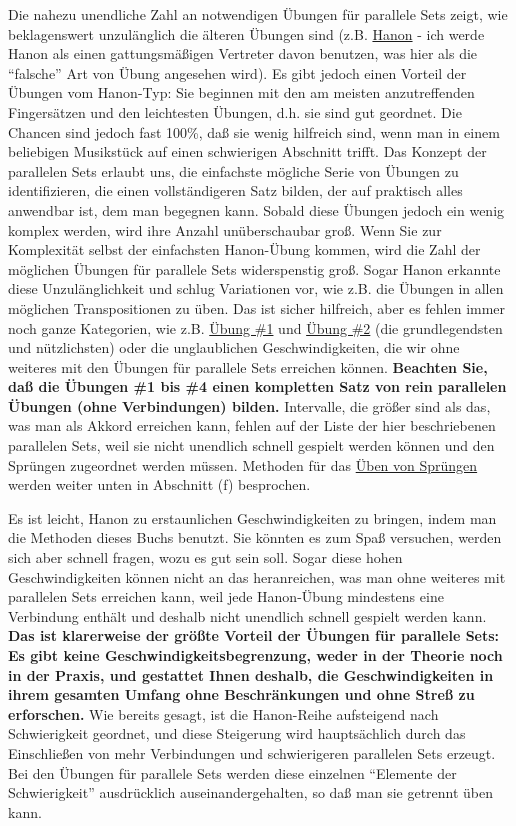 Die nahezu unendliche Zahl an notwendigen Übungen für parallele Sets zeigt, wie beklagenswert unzulänglich die älteren Übungen sind (z.B. \hyperlink{c1iii7h}{Hanon} - ich werde Hanon als einen gattungsmäßigen Vertreter davon benutzen, was hier als die \enquote{falsche} Art von Übung angesehen wird).
Es gibt jedoch einen Vorteil der Übungen vom Hanon-Typ: Sie beginnen mit den am meisten anzutreffenden Fingersätzen und den leichtesten Übungen, d.h. sie sind gut geordnet.
Die Chancen sind jedoch fast 100\%, daß sie wenig hilfreich sind, wenn man in einem beliebigen Musikstück auf einen schwierigen Abschnitt trifft.
Das Konzept der parallelen Sets erlaubt uns, die einfachste mögliche Serie von Übungen zu identifizieren, die einen vollständigeren Satz bilden, der auf praktisch alles anwendbar ist, dem man begegnen kann.
Sobald diese Übungen jedoch ein wenig komplex werden, wird ihre Anzahl unüberschaubar groß.
Wenn Sie zur Komplexität selbst der einfachsten Hanon-Übung kommen, wird die Zahl der möglichen Übungen für parallele Sets widerspenstig groß.
Sogar Hanon erkannte diese Unzulänglichkeit und schlug Variationen vor, wie z.B. die Übungen in allen möglichen Transpositionen zu üben.
Das ist sicher hilfreich, aber es fehlen immer noch ganze Kategorien, wie z.B. \hyperlink{c1iii7b1}{Übung \#1} und \hyperlink{c1iii7b2}{Übung \#2} (die grundlegendsten und nützlichsten) oder die unglaublichen Geschwindigkeiten, die wir ohne weiteres mit den Übungen für parallele Sets erreichen können.
\textbf{Beachten Sie, daß die Übungen \#1 bis \#4 einen kompletten Satz von rein parallelen Übungen (ohne Verbindungen) bilden.}
Intervalle, die größer sind als das, was man als Akkord erreichen kann, fehlen auf der Liste der hier beschriebenen parallelen Sets, weil sie nicht unendlich schnell gespielt werden können und den Sprüngen zugeordnet werden müssen.
Methoden für das \hyperlink{c1iii7f}{Üben von Sprüngen} werden weiter unten in Abschnitt (f) besprochen.

Es ist leicht, Hanon zu erstaunlichen Geschwindigkeiten zu bringen, indem man die Methoden dieses Buchs benutzt.
Sie könnten es zum Spaß versuchen, werden sich aber schnell fragen, wozu es gut sein soll.
Sogar diese hohen Geschwindigkeiten können nicht an das heranreichen, was man ohne weiteres mit parallelen Sets erreichen kann, weil jede Hanon-Übung mindestens eine Verbindung enthält und deshalb nicht unendlich schnell gespielt werden kann.
\textbf{Das ist klarerweise der größte Vorteil der Übungen für parallele Sets: Es gibt keine Geschwindigkeitsbegrenzung, weder in der Theorie noch in der Praxis, und gestattet Ihnen deshalb, die Geschwindigkeiten in ihrem gesamten Umfang ohne Beschränkungen und ohne Streß zu erforschen.}
Wie bereits gesagt, ist die Hanon-Reihe aufsteigend nach Schwierigkeit geordnet, und diese Steigerung wird hauptsächlich durch das Einschließen von mehr Verbindungen und schwierigeren parallelen Sets erzeugt.
Bei den Übungen für parallele Sets werden diese einzelnen \enquote{Elemente der Schwierigkeit} ausdrücklich auseinandergehalten, so daß man sie getrennt üben kann.


